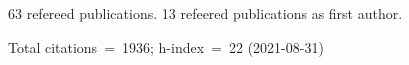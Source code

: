 63 refereed publications. 13 refeered publications as first author.

Total citations~=~1936; h-index~=~22 (2021-08-31)